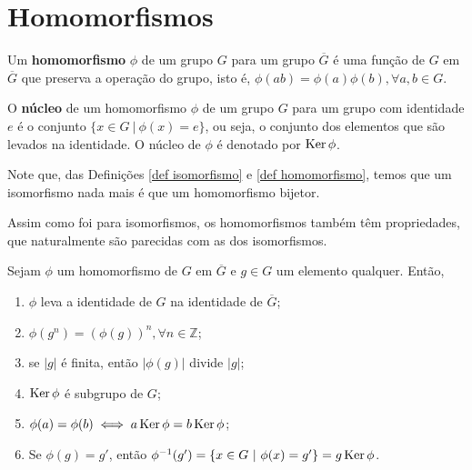 \section{Homomorfismos}
\label{sec-homomorfismos}
    \begin{definition}[Homomorfismo]
	\label{def homomorfismo}
		Um \textbf{homomorfismo} $\phi$ de um grupo $G$ para um grupo $\overline{G}$ é uma função 
		de $G$ em $\overline{G}$ que preserva a operação do grupo, isto é, 
		$\phi(ab) = \phi(a)\phi(b), \forall a,b\in G$.
	\end{definition}
	\begin{definition}[Núcleo]
	\label{def nucleo}
		O \textbf{núcleo} de um homomorfismo $\phi$ de um grupo $G$ para um grupo com identidade $e$ 
		é o conjunto $\{ x\in G \ | \ \phi(x) = e \}$, ou seja, o conjunto dos elementos que são 
		levados na identidade. O núcleo de $\phi$ é denotado por $\operatorname{Ker}\phi$.
	\end{definition}
	\begin{remark}
		Note que, das Definições \ref{def isomorfismo} e \ref{def homomorfismo}, temos que um 
		isomorfismo nada mais é que um homomorfismo bijetor.
	\end{remark}
	\par\vspace{0.3cm} Assim como foi para isomorfismos, os homomorfismos também têm propriedades, que
	naturalmente são parecidas com as dos isomorfismos.
	\begin{theorem}
	\label{homomorfismos em elementos}
		Sejam $\phi$ um homomorfismo de $G$ em $\overline{G}$ e $g\in G$ um elemento qualquer. Então, 
		\begin{enumerate}
			\item $\phi$ leva a identidade de $G$ na identidade de $\overline{G}$;
			\item $\phi(g^n) = (\phi(g))^n, \forall n\in \mathbb{Z}$;
			\item se $|g|$ é finita, então $|\phi(g)|$ divide $|g|$;
			\item $\operatorname{Ker}\phi$ é subgrupo de $G$;
			\item $\phi(a) = \phi(b) \iff a\operatorname{Ker}\phi = b\operatorname{Ker}\phi$;
			\item Se $\phi(g) = g'$, então $\phi^{-1}(g') = \{ x\in G \ | \ \phi(x) = g' \} = g\operatorname{Ker}\phi$.
		\end{enumerate}
	\end{theorem}

